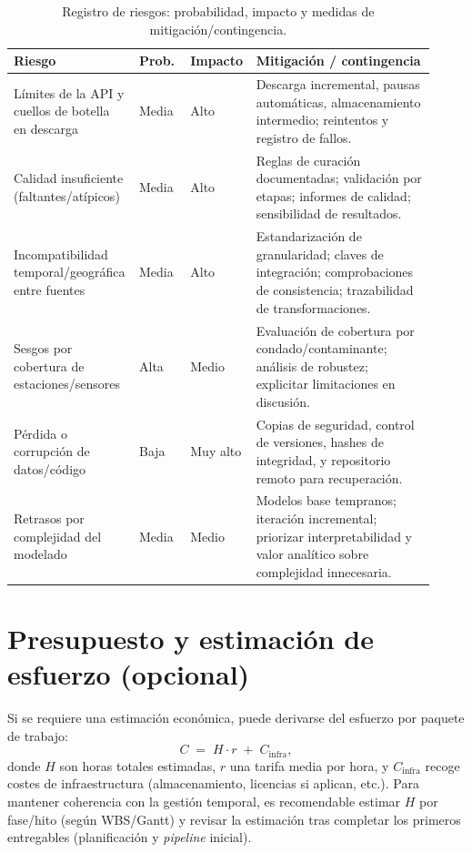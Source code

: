 \begin{table}[htbp]
\centering
\small
\renewcommand{\arraystretch}{1.15}
\begin{tabular}{p{0.26\linewidth} p{0.12\linewidth} p{0.12\linewidth} p{0.42\linewidth}}
\hline
\textbf{Riesgo} & \textbf{Prob.} & \textbf{Impacto} & \textbf{Mitigación / contingencia} \\
\hline
Límites de la API y cuellos de botella en descarga & Media & Alto &
Descarga incremental, pausas automáticas, almacenamiento intermedio; reintentos y registro de fallos. \\
Calidad insuficiente (faltantes/atípicos) & Media & Alto &
Reglas de curación documentadas; validación por etapas; informes de calidad; sensibilidad de resultados. \\
Incompatibilidad temporal/geográfica entre fuentes & Media & Alto &
Estandarización de granularidad; claves de integración; comprobaciones de consistencia; trazabilidad de transformaciones. \\
Sesgos por cobertura de estaciones/sensores & Alta & Medio &
Evaluación de cobertura por condado/contaminante; análisis de robustez; explicitar limitaciones en discusión. \\
Pérdida o corrupción de datos/código & Baja & Muy alto &
Copias de seguridad, control de versiones, hashes de integridad, y repositorio remoto para recuperación. \\
Retrasos por complejidad del modelado & Media & Medio &
Modelos base tempranos; iteración incremental; priorizar interpretabilidad y valor analítico sobre complejidad innecesaria. \\
\hline
\end{tabular}
\caption{Registro de riesgos: probabilidad, impacto y medidas de mitigación/contingencia.}
\label{tab:riesgos}
\end{table}

\section{Presupuesto y estimación de esfuerzo (opcional)}\label{sec:presupuesto-y-estimacion-de-esfuerzo-(opcional)}

Si se requiere una estimación económica, puede derivarse del esfuerzo por paquete de trabajo:
\[
C \;=\; H \cdot r \;+\; C_{\mathrm{infra}},
\]
donde $H$ son horas totales estimadas, $r$ una tarifa media por hora, y $C_{\mathrm{infra}}$ recoge
costes de infraestructura (almacenamiento, licencias si aplican, etc.). Para mantener coherencia con
la gestión temporal, es recomendable estimar $H$ por fase/hito (según WBS/Gantt) y revisar la
estimación tras completar los primeros entregables (planificación y \emph{pipeline} inicial).

